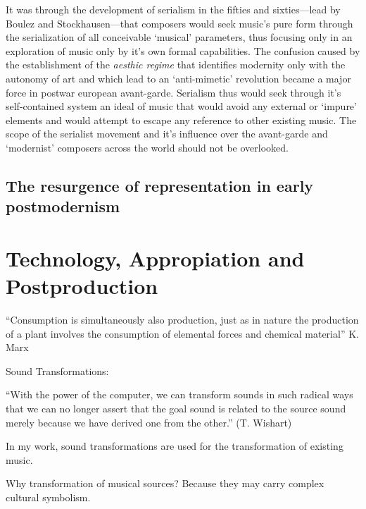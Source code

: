 It was through the development of serialism in the fifties and sixties---lead by Boulez and Stockhausen---that composers would seek music's pure form through the serialization of all conceivable `musical' parameters, thus focusing only in an exploration of music only by it's own formal capabilities. The confusion caused by the establishment of the \emph{aesthic regime} that identifies modernity only with the autonomy of art and which lead to an `anti-mimetic' revolution became a major force in postwar european avant-garde. Serialism thus would seek through it's self-contained system an ideal of music that would avoid any external or `impure' elements and would attempt to escape any reference to other existing music. The scope of the serialist movement and it's influence over the avant-garde and `modernist' composers across the world should not be overlooked. 


%
%


\subsection{The resurgence of representation in early postmodernism}

\newpage

\section{Technology, Appropiation and Postproduction} 

``Consumption is simultaneously also production, just as in nature the production of a plant involves the consumption of elemental forces and chemical material'' K. Marx

Sound Transformations: 					

``With the power of the computer, we can transform sounds in such radical ways that we can no longer assert that the goal sound is related to the source sound merely because we have derived one from the other.'' (T. Wishart)

In my work, sound transformations are used for the transformation of existing music. 

Why transformation of musical sources? Because they may carry complex cultural symbolism. 

